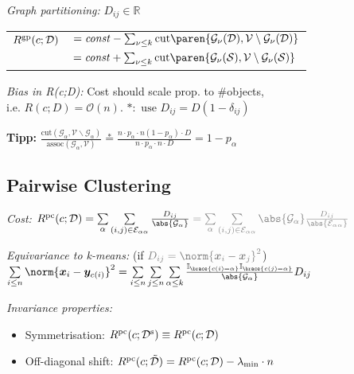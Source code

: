\columnbreak
\emph{Graph partitioning:}
\quad $D_{ij} \in \mathbb R$\\
\begin{tabular}{@{} l @{} l @{}}
    $R^\mathrm{gp} (c; \mathcal D)$ &
        $= \mathit{const} - \sum_{\nu\leq k} \mathrm{cut} \paren{ \mathcal G_\nu (\mathcal D), \mathcal V \setminus \mathcal G_\nu (\mathcal D) }$
    \\ &
        $= \mathit{const} + \sum_{\nu\leq k} \mathrm{cut} \paren{ \mathcal G_\nu (\mathcal S), \mathcal V \setminus \mathcal G_\nu (\mathcal S) }$
\end{tabular}

\emph{Bias in \textit{\rmfamily R(c;D)}:}\enspace
Cost should scale prop. to \#objects,\\
i.e. $R(c;D) = \mathcal O(n)$.
\qquad $\ast: \text{ use } D_{ij} = D(1 - \delta_{ij})$

\textbf{Tipp:}\enspace
$\frac{\mathrm{cut}(\mathcal G_\alpha, \mathcal V \backslash \mathcal G_\alpha)}{\mathrm{assoc}(\mathcal G_\alpha, \mathcal V)}
\overset\ast= \frac{n\cdot p_\alpha \cdot n(1-p_\alpha) \cdot D}{n\cdot p_\alpha \cdot n \cdot D} = 1 - p_\alpha$

\subsection{Pairwise Clustering}

\emph{Cost:}\enspace
$R\ap{pc} (c; \mathcal D)
= \sum\limits_\alpha \sum\limits_{(i,j) \in \mathcal E_{\alpha\alpha}} \frac{D_{ij}}{\abs{\mathcal G_\alpha}}
\color{gray}
= \sum\limits_\alpha \sum\limits_{(i,j) \in \mathcal E_{\alpha\alpha}} \abs{\mathcal G_\alpha} \frac{D_{ij}}{\abs{\mathcal E_{\alpha\alpha}}}$

\emph{Equivariance to \textit{\rmfamily k}-means:}
{\small\color{gray}\quad(if $\color{gray} D_{ij} = \norm{\bm x_i - \bm x_j}^2$)}\\
$\sum\limits_{i\leq n} \norm{\bm x_i - \bm y_{c(i)}}^2 = \sum\limits_{i\leq n} \sum\limits_{j\leq n} \sum\limits_{\alpha\leq k} \frac{\mathbb I_{\brace{c(i) = \alpha}} \mathbb I_{\brace{c(j) = \alpha}}}{\abs{\mathcal G_\alpha}} D_{ij}$


\emph{Invariance properties:}\\
\begin{itemize}
    \item Symmetrisation:
        \enskip $R^\mathrm{pc} (c; \mathcal D^\mathrm{s}) \equiv R^\mathrm{pc} (c; \mathcal D)$
    \item Off-diagonal shift:
        \enskip $R^\mathrm{pc} (c; \tilde{\mathcal D}) = R^\mathrm{pc} (c; \mathcal D) - \lambda_\mathrm{min}\cdot n$
\end{itemize}


